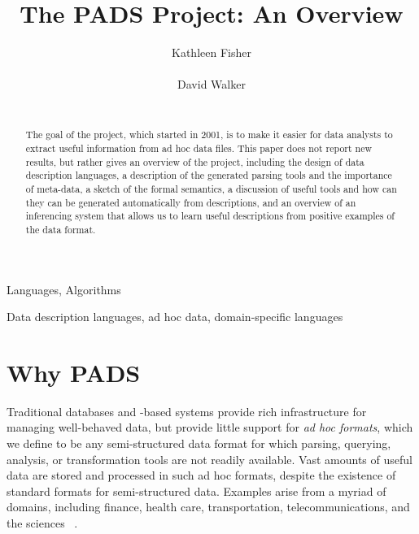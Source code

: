 \documentclass{sig-alternate}
\begin{document}
\title{The PADS Project: An Overview}
\author{
\alignauthor
Kathleen Fisher\\
  \\
\alignauthor
David Walker\\
  \\
  }



\maketitle{}

\begin{abstract}  
  The goal of the \pads{} project, which started in 2001, is to make
  it easier for data analysts to extract useful information from ad
  hoc data files.  This paper does not report new results, but rather
  gives an overview of the project, including the design of \pads{}
  data description languages, a description of the generated parsing
  tools and the importance of meta-data, a sketch of the formal
  semantics, a discussion of useful tools and how can they can be
  generated automatically from \pads{} descriptions, and an overview
  of an inferencing system that allows us to learn useful \pads{}
  descriptions from positive examples of the data format.
\end{abstract}


\terms
Languages, Algorithms

\keywords
Data description languages, ad hoc data,  domain-specific languages


\section {Why PADS}
\label{sec:intro}

Traditional databases and \xml{}-based systems provide rich
infrastructure for managing well-behaved data, but provide little
support for \textit{ad hoc formats}, which we define to be any
semi-structured data format for which parsing, querying, analysis, or
transformation tools are not readily available.  Vast amounts of
useful data are stored and processed in such ad hoc formats, despite
the existence of standard formats for semi-structured data.  Examples
arise from a myriad of domains, including finance, health care,
transportation, telecommunications, and the sciences ~\cite{fisher+:pads}. 
\end{document}

